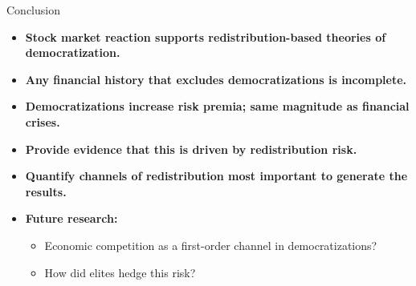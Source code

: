

\begin{frame}[noframenumbering]{Conclusion}
	\begin{itemize}
		\item<1-> \textbf{Stock market reaction supports redistribution-based theories of democratization.}
		\vspace{.45cm}		
		\item<2-> \textbf{Any financial history that excludes democratizations is incomplete.}
		\vspace{.45cm}
		\item<3-> \textbf{Democratizations increase risk premia; same magnitude as financial crises.}
		\vspace{.45cm}
		\item<4-> \textbf{Provide evidence that this is driven by redistribution risk.}
		\vspace{.45cm}
		\item<5-> \textbf{Quantify channels of redistribution most important to generate the results.}
		\vspace{.45cm}
		\item<6->  \textbf{Future research:}
		\vspace{.15cm}
		\begin{itemize}
			\item<6->[--] Economic competition as a first-order channel in democratizations? 
			\vspace{.15cm}
			\item<6->[--] How did elites hedge this risk?
		\end{itemize}
	\end{itemize}

\end{frame}